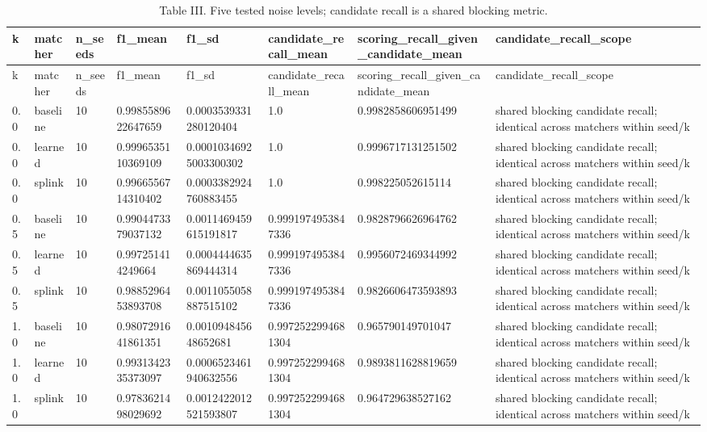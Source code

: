 \begin{longtable}{llllllll}
\caption{Table III. Five tested noise levels; candidate recall is a shared blocking metric.}\\
\toprule
k & matcher & n\_seeds & f1\_mean & f1\_sd & candidate\_recall\_mean & scoring\_recall\_given\_candidate\_mean & candidate\_recall\_scope \\
\midrule
\endfirsthead
\toprule
k & matcher & n\_seeds & f1\_mean & f1\_sd & candidate\_recall\_mean & scoring\_recall\_given\_candidate\_mean & candidate\_recall\_scope \\
\midrule
\endhead
0.0 & baseline & 10 & 0.9985589622647659 & 0.0003539331280120404 & 1.0 & 0.9982858606951499 & shared blocking candidate recall; identical across matchers within seed/k \\
0.0 & learned & 10 & 0.9996535110369109 & 0.00010346925003300302 & 1.0 & 0.9996717131251502 & shared blocking candidate recall; identical across matchers within seed/k \\
0.0 & splink & 10 & 0.9966556714310402 & 0.0003382924760883455 & 1.0 & 0.998225052615114 & shared blocking candidate recall; identical across matchers within seed/k \\
0.5 & baseline & 10 & 0.9904473379037132 & 0.0011469459615191817 & 0.9991974953847336 & 0.9828796626964762 & shared blocking candidate recall; identical across matchers within seed/k \\
0.5 & learned & 10 & 0.997251414249664 & 0.0004444635869444314 & 0.9991974953847336 & 0.9956072469344992 & shared blocking candidate recall; identical across matchers within seed/k \\
0.5 & splink & 10 & 0.9885296453893708 & 0.0011055058887515102 & 0.9991974953847336 & 0.9826606473593893 & shared blocking candidate recall; identical across matchers within seed/k \\
1.0 & baseline & 10 & 0.9807291641861351 & 0.001094845648652681 & 0.9972522994681304 & 0.965790149701047 & shared blocking candidate recall; identical across matchers within seed/k \\
1.0 & learned & 10 & 0.9931342335373097 & 0.0006523461940632556 & 0.9972522994681304 & 0.9893811628819659 & shared blocking candidate recall; identical across matchers within seed/k \\
1.0 & splink & 10 & 0.9783621498029692 & 0.0012422012521593807 & 0.9972522994681304 & 0.964729638527162 & shared blocking candidate recall; identical across matchers within seed/k \\

\end{longtable}
